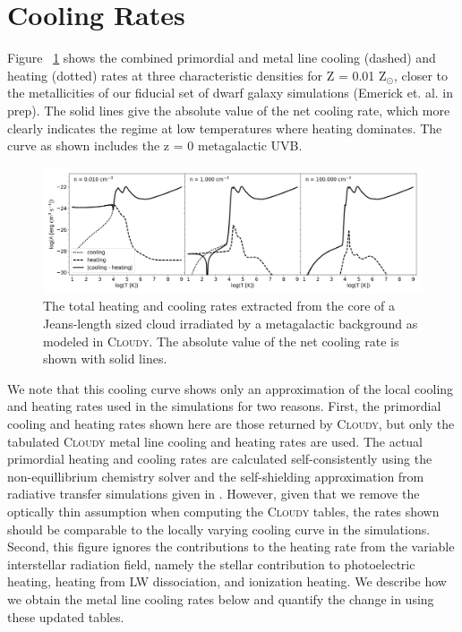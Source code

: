 \documentclass[twocolumn]{aastex61}
\begin{document}
\section{Cooling Rates}
\label{appendix:cooling}
Figure ~\ref{fig:cooling} shows the combined primordial and metal line cooling (dashed) and heating (dotted) rates at three characteristic densities for Z = 0.01 Z$_{\odot}$, closer to the metallicities of our fiducial set of dwarf galaxy simulations (Emerick et. al. in prep). The solid lines give the absolute value of the net cooling rate, which more clearly indicates the regime at low temperatures where heating dominates. The curve as shown includes the z = 0 \citet{HM2012} metagalactic UVB.

\begin{figure}
\centering
\includegraphics[width=0.95\linewidth]{cooling_curve}
\caption{The total heating and cooling rates extracted from the core of a Jeans-length sized cloud irradiated by a \citet{HM2012} metagalactic background as modeled in \textsc{Cloudy}. The absolute value of the net cooling rate is shown with solid lines.}
\label{fig:cooling}
\end{figure}

We note that this cooling curve shows only an approximation of the local cooling and heating rates used in the simulations for two reasons. First, the primordial cooling and heating rates shown here are those returned by \textsc{Cloudy}, but only the tabulated \textsc{Cloudy} metal line cooling and heating rates are used. The actual primordial heating and cooling rates are calculated self-consistently using the non-equillibrium chemistry solver and the self-shielding approximation from radiative transfer simulations given in \citet{Rahmati2013}. However, given that we remove the optically thin assumption when computing the \textsc{Cloudy} tables, the rates shown should be comparable to the locally varying cooling curve in the simulations. Second, this figure ignores the contributions to the heating rate from the variable interstellar radiation field, namely the stellar contribution to photoelectric heating, heating from LW dissociation, and ionization heating. We describe how we obtain the metal line cooling rates below and quantify the change in using these updated tables. 
\end{document}
